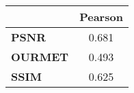 \begin{tabular}{|l|c|}
\hline
&\textbf{Pearson}\\\hline
\textbf{PSNR}&0.681\\\hline
\textbf{OURMET}&0.493\\\hline
\textbf{SSIM}&0.625\\\hline
\end{tabular}
